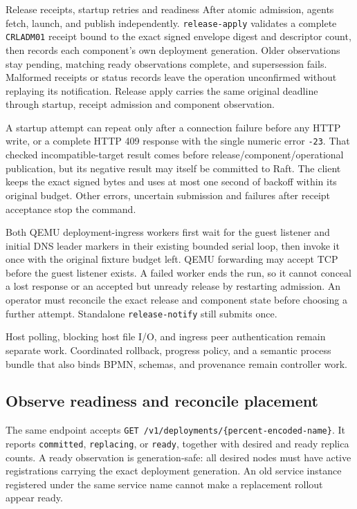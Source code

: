 \begin{implementationdetail}{Release receipts, startup retries and readiness}
After atomic admission, agents fetch, launch, and publish independently.
\texttt{release-apply} validates a complete \texttt{CRLADM01} receipt bound to the
exact signed envelope digest and descriptor count, then records each component's
own deployment generation. Older observations stay pending, matching ready
observations complete, and supersession fails. Malformed receipts or status
records leave the operation unconfirmed without replaying its notification.
Release apply carries the same original deadline through startup, receipt
admission and component observation.

A startup attempt can repeat only after a
connection failure before any HTTP write, or a complete HTTP 409 response with
the single numeric error \texttt{-23}. That checked incompatible-target result
comes before release/component/operational publication, but its negative result may
itself be committed to Raft. The client keeps the exact signed bytes and uses
at most one second of backoff within its original budget. Other errors, uncertain
submission and failures after receipt acceptance stop the command.

Both QEMU
deployment-ingress workers first wait for the guest listener and initial DNS
leader markers in their existing bounded serial loop, then invoke it once with the original fixture
budget left. QEMU forwarding may accept TCP before the guest listener exists. A
failed worker ends the run, so it cannot conceal a lost response or an accepted but
unready release by restarting admission. An operator must
reconcile the exact release and component state before choosing a further
attempt. Standalone \texttt{release-notify} still submits once.

Host polling, blocking host file I/O, and ingress peer
authentication remain separate work. Coordinated rollback, progress policy, and a semantic process bundle that
also binds BPMN, schemas, and provenance remain controller work.
\end{implementationdetail}

\subsection{Observe readiness and reconcile placement}

The same endpoint accepts
\texttt{GET /v1/deployments/\{percent-encoded-name\}}. It reports
\texttt{committed}, \texttt{replacing}, or \texttt{ready}, together with
desired and ready replica counts. A ready observation is generation-safe: all
desired nodes must have active registrations carrying the exact deployment
generation. An old service instance registered under the same service name
cannot make a replacement rollout appear ready.


